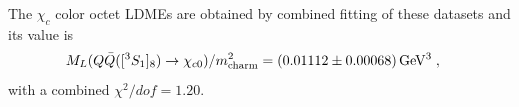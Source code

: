 \documentclass[aps,prc,preprint,superscriptaddress,showpacs,showkeys,amsmath]{revtex4-1}
\begin{document}
The $\chi_{c}$ color octet LDMEs are obtained by combined fitting of these datasets
and its value is 
\begin{equation}
  \begin{split}
    M_{L}(Q{\bar{Q}}([^3S_1]_{8})\rightarrow \chi_{c0})/m_{{\rm{charm}}}^2 & 
    = (0.01112\pm {\color{black} 0.00068})\,{\rm GeV^3}\;,
    \label{eq:Mchicn1CO_val}
  \end{split}
\end{equation}
with a combined {\color{red} $\chi^2/dof=1.20$}. 
\end{document}
